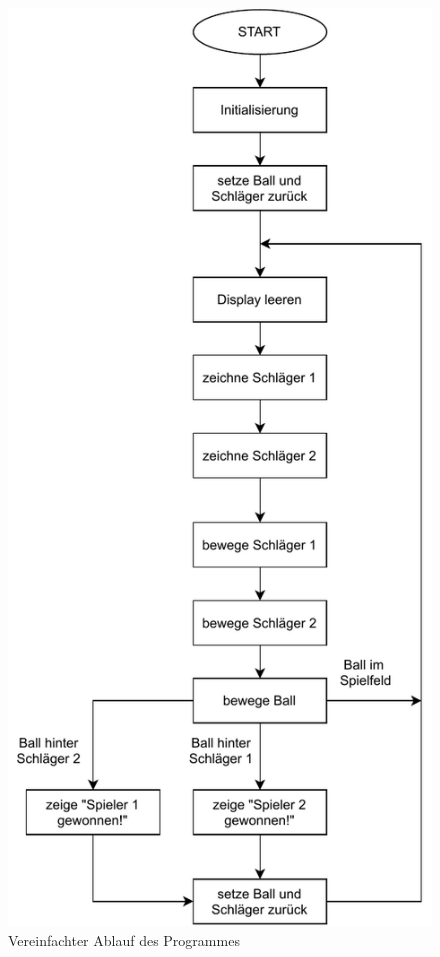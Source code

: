 \begin{figure}[H]
\centering
\includegraphics[height=0.8\textheight]{./Bilder/Programmablauf.pdf}
\centering\caption{Vereinfachter Ablauf des Programmes}
\label{fig:PAP}
\end{figure}

